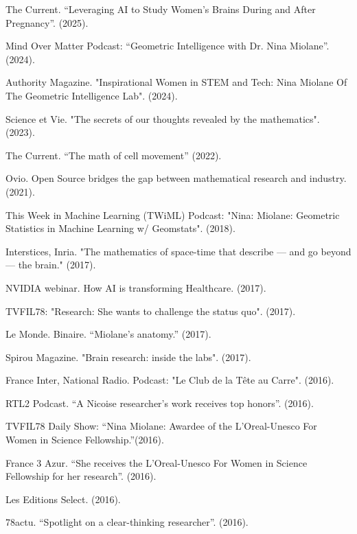 The Current. “Leveraging AI to Study Women’s Brains During and After Pregnancy”. (2025).

Mind Over Matter Podcast: “Geometric Intelligence with Dr. Nina Miolane”. (2024).

Authority Magazine. "Inspirational Women in STEM and Tech: Nina Miolane Of The Geometric Intelligence Lab". (2024).

Science et Vie. "The secrets of our thoughts revealed by the mathematics". (2023).

The Current. “The math of cell movement” (2022).

Ovio. Open Source bridges the gap between mathematical research and industry. (2021).

This Week in Machine Learning (TWiML) Podcast: "Nina: Miolane: Geometric Statistics in Machine Learning w/ Geomstats". (2018).

Interstices, Inria. "The mathematics of space-time that describe — and go beyond — the brain." (2017).

NVIDIA webinar. How AI is transforming Healthcare. (2017).

TVFIL78: "Research: She wants to challenge the status quo". (2017).

Le Monde. Binaire. “Miolane’s anatomy.” (2017).

Spirou Magazine. "Brain research: inside the labs". (2017).

France Inter, National Radio. Podcast: "Le Club de la Tête au Carre". (2016). 

RTL2 Podcast. “A Nicoise researcher’s work receives top honors”. (2016).

TVFIL78 Daily Show: “Nina Miolane: Awardee of the L’Oreal-Unesco For Women in Science Fellowship.”(2016).

France 3 Azur. “She receives the L’Oreal-Unesco For Women in Science Fellowship for her research”. (2016).

Les Editions Select. (2016).

78actu. “Spotlight on a clear-thinking researcher”. (2016).